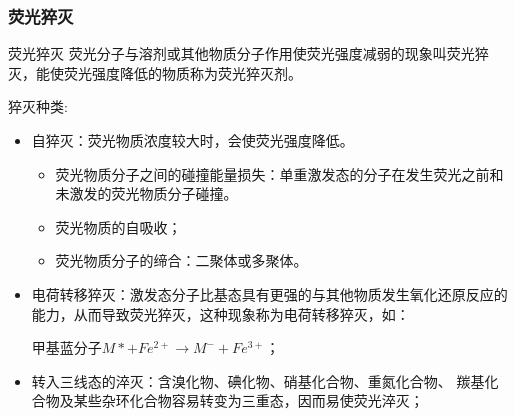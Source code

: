 \subsubsection{荧光猝灭}
\begin{definition*}{荧光猝灭}
	荧光分子与溶剂或其他物质分子作用使荧光强度减弱的现象叫荧光猝灭，能使荧光强度降低的物质称为荧光猝灭剂。
\end{definition*}
猝灭种类:
\begin{itemize}
	\item 自猝灭：荧光物质浓度较大时，会使荧光强度降低。
	\begin{itemize}
		\item 荧光物质分子之间的碰撞能量损失：单重激发态的分子在发生荧光之前和未激发的荧光物质分子碰撞。
		\item 荧光物质的自吸收；
		\item 荧光物质分子的缔合：二聚体或多聚体。
	\end{itemize}
	\item 电荷转移猝灭：激发态分子比基态具有更强的与其他物质发生氧化还原反应的能力，从而导致荧光猝灭，这种现象称为电荷转移猝灭，如：
	
	甲基蓝分子$M*+Fe^{2+} →M^{-}+Fe^{3+}$；
	\item 转入三线态的淬灭：含溴化物、碘化物、硝基化合物、重氮化合物、 羰基化合物及某些杂环化合物容易转变为三重态，因而易使荧光淬灭；
\end{itemize}


